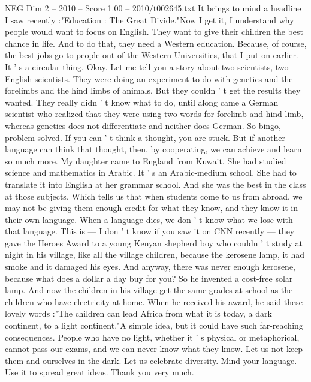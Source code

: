 \begin{textsample}{NEG Dim 2 – 2010 – Score 1.00 – 2010/t002645.txt}
It brings to mind a headline I saw recently :"Education : The Great Divide."Now I get it, I understand why people would want to focus on English.
They want to give their children the best chance in life.
And to do that, they need a Western education.
Because, of course, the best jobs go to people out of the Western Universities, that I put on earlier.
It ' s a circular thing.
Okay.
Let me tell you a story about two scientists, two English scientists.
They were doing an experiment to do with genetics and the forelimbs and the hind limbs of animals.
But they couldn ' t get the results they wanted.
They really didn ' t know what to do, until along came a German scientist who realized that they were using two words for forelimb and hind limb, whereas genetics does not differentiate and neither does German.
So bingo, problem solved.
If you can ' t think a thought, you are stuck.
But if another language can think that thought, then, by cooperating, we can achieve and learn so much more.
My daughter came to England from Kuwait.
She had studied science and mathematics in Arabic.
It ' s an Arabic-medium school.
She had to translate it into English at her grammar school.
And she was the best in the class at those subjects.
Which tells us that when students come to us from abroad, we may not be giving them enough credit for what they know, and they know it in their own language.
When a language dies, we don ' t know what we lose with that language.
This is — I don ' t know if you saw it on CNN recently — they gave the Heroes Award to a young Kenyan shepherd boy who couldn ' t study at night in his village, like all the village children, because the kerosene lamp, it had smoke and it damaged his eyes.
And anyway, there was never enough kerosene, because what does a dollar a day buy for you?
So he invented a cost-free solar lamp.
And now the children in his village get the same grades at school as the children who have electricity at home.
When he received his award, he said these lovely words :"The children can lead Africa from what it is today, a dark continent, to a light continent."A simple idea, but it could have such far-reaching consequences.
People who have no light, whether it ' s physical or metaphorical, cannot pass our exams, and we can never know what they know.
Let us not keep them and ourselves in the dark.
Let us celebrate diversity.
Mind your language.
Use it to spread great ideas.
Thank you very much.

\end{textsample}
